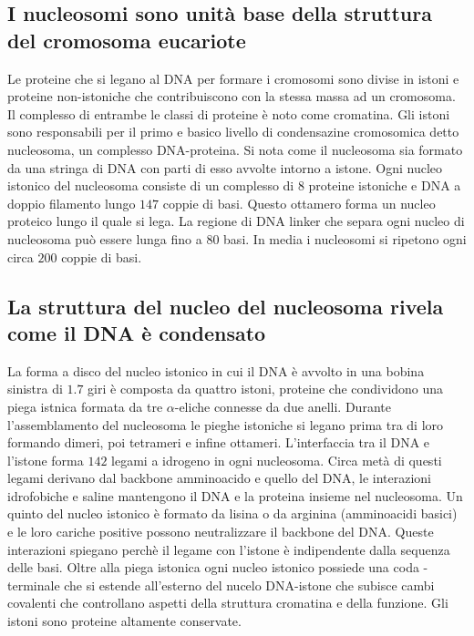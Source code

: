 \subsection{I nucleosomi sono unit\`a base della struttura del cromosoma eucariote}
Le proteine che si legano al DNA per formare i cromosomi sono divise in istoni e proteine non-istoniche che contribuiscono con la stessa massa ad un cromosoma. Il complesso di entrambe 
le classi di proteine \`e noto come cromatina. Gli istoni sono responsabili per il primo e basico livello di condensazine cromosomica detto nucleosoma, un complesso DNA-proteina. Si nota
come il nucleosoma sia formato da una stringa di DNA con parti di esso avvolte intorno a istone. Ogni nucleo istonico del nucleosoma consiste di un complesso di $8$ proteine istoniche
e DNA a doppio filamento lungo $147$ coppie di basi. Questo ottamero forma un nucleo proteico lungo il quale si lega. La regione di DNA linker che separa ogni nucleo di nucleosoma
pu\`o essere lunga fino a $80$ basi. In media i nucleosomi si ripetono ogni circa $200$ coppie di basi. 
\subsection{La struttura del nucleo del nucleosoma rivela come il DNA \`e condensato}
La forma a disco del nucleo istonico in cui il DNA \`e avvolto in una bobina sinistra di $1.7$ giri \`e composta da quattro istoni, proteine che condividono una piega istnica formata da
tre $\alpha$-eliche connesse da due anelli. Durante l'assemblamento del nucleosoma le pieghe istoniche si legano prima tra di loro formando dimeri, poi tetrameri e infine ottameri. 
L'interfaccia tra il DNA e l'istone forma $142$ legami a idrogeno in ogni nucleosoma. Circa met\`a di questi legami derivano dal backbone amminoacido e quello del DNA, le interazioni
idrofobiche e saline mantengono il DNA e la proteina insieme nel nucleosoma. Un quinto del nucleo istonico \`e formato da lisina o da arginina (amminoacidi basici) e le loro cariche 
positive possono neutralizzare il backbone del DNA. Queste interazioni spiegano perch\`e il legame con l'istone \`e indipendente dalla sequenza delle basi. Oltre alla piega istonica
ogni nucleo istonico possiede una coda -terminale che si estende all'esterno del nucelo DNA-istone che subisce cambi covalenti che controllano aspetti della struttura cromatina
e della funzione. Gli istoni sono proteine altamente conservate. 
